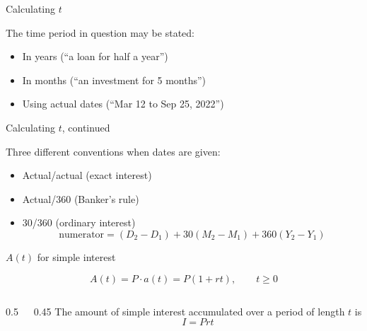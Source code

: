 \documentclass{beamer}
\begin{document}
\begin{frame}{Calculating $t$}

The time period in question may be stated:
\begin{itemize}
\item In years (``a loan for half a year'')
\vspace{2em}
\item In months (``an investment for 5 months'')
\vspace{2em}
\item Using actual dates (``Mar 12 to Sep 25, 2022'')
\end{itemize}

\end{frame}

\begin{frame}{Calculating $t$, continued}

Three different conventions when dates are given:
\begin{itemize}
\item Actual/actual (exact interest)
\vspace{2em}
\item Actual/360 (Banker's rule)
\vspace{2em}
\item 30/360 (ordinary interest)
\[
\text{numerator} = (D_2 - D_1) + 30(M_2 - M_1) + 360(Y_2 - Y_1)
\]
\end{itemize}

\end{frame}

\begin{frame}{$A(t)$ for simple interest}

\[
A(t) = P \cdot a(t) = P(1 + rt), \qquad t \ge 0
\]

\begin{columns}
\begin{column}{0.5\textwidth}
\centering
{}
\end{column}
\begin{column}{0.45\textwidth}
\centering
The amount of simple interest accumulated over a period of length $t$ is
\[
I = Prt
\]
\end{column}
\end{columns}

\end{frame}
\end{document}
